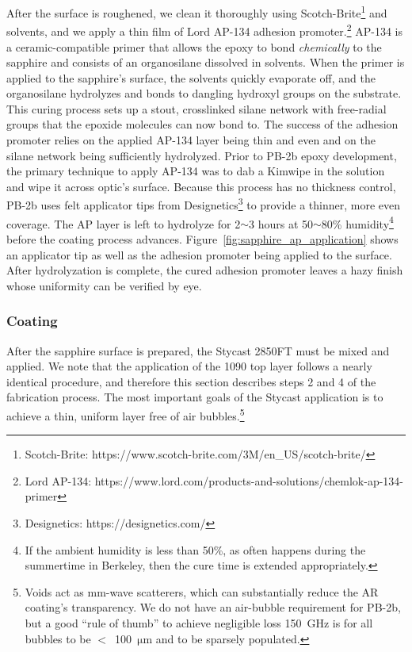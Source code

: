 After the surface is roughened, we clean it thoroughly using Scotch-Brite\footnote{Scotch-Brite: https://www.scotch-brite.com/3M/en\_US/scotch-brite/} and solvents, and we apply a thin film of Lord AP-134 adhesion promoter.\footnote{Lord AP-134: https://www.lord.com/products-and-solutions/chemlok-ap-134-primer} AP-134 is a ceramic-compatible primer that allows the epoxy to bond \textit{chemically} to the sapphire and consists of an organosilane dissolved in solvents. When the primer is applied to the sapphire's surface, the solvents quickly evaporate off, and the organosilane hydrolyzes and bonds to dangling hydroxyl groups on the substrate. This curing process sets up a stout, crosslinked silane network with free-radial groups that the epoxide molecules can now bond to. The success of the adhesion promoter relies on the applied AP-134 layer being thin and even and on the silane network being sufficiently hydrolyzed. Prior to PB-2b epoxy development, the primary technique to apply AP-134 was to dab a Kimwipe in the solution and wipe it across optic's surface. Because this process has no thickness control, PB-2b uses felt applicator tips from Designetics\footnote{Designetics: https://designetics.com/} to provide a thinner, more even coverage. The AP layer is left to hydrolyze for 2$\sim$3 hours at 50$\sim$80\% humidity\footnote{If the ambient humidity is less than 50\%, as often happens during the summertime in Berkeley, then the cure time is extended appropriately.} before the coating process advances. Figure~\ref{fig:sapphire_ap_application} shows an applicator tip as well as the adhesion promoter being applied to the surface. After hydrolyzation is complete, the cured adhesion promoter leaves a hazy finish whose uniformity can be verified by eye.


\subsubsection{Coating}
\label{sec:sapphire_ar_coating_epoxy_fabrication_coating}

After the sapphire surface is prepared, the Stycast 2850FT must be mixed and applied. We note that the application of the 1090 top layer follows a nearly identical procedure, and therefore this section describes steps 2 and 4 of the fabrication process. The most important goals of the Stycast application is to achieve a thin, uniform layer free of air bubbles.\footnote{Voids act as mm-wave scatterers, which can substantially reduce the AR coating's transparency. We do not have an air-bubble requirement for PB-2b, but a good ``rule of thumb'' to achieve negligible loss 150~GHz is for all bubbles to be $<$~100~$\mathrm{\mu m}$ and to be sparsely populated.}

